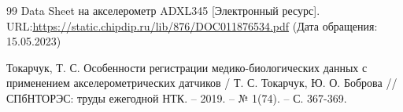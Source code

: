 \newpage
\renewcommand\refname{\centering СПИСОК ИСПОЛЬЗОВАННЫХ ИСТОЧНИКОВ}
\begin {thebibliography} {99}
Data Sheet на акселерометр ADXL345  [Электронный ресурс]. URL:\href{https://static.chipdip.ru/lib/876/DOC011876534.pdf}{https://static.chipdip.ru/lib/876/DOC011876534.pdf} (Дата обращения: 15.05.2023)

Токарчук, Т. С. Особенности регистрации медико-биологических данных с применением акселерометрических датчиков / Т. С. Токарчук, Ю. О. Боброва // СПбНТОРЭС: труды ежегодной НТК. – 2019. – № 1(74). – С. 367-369. 


\end {thebibliography}



